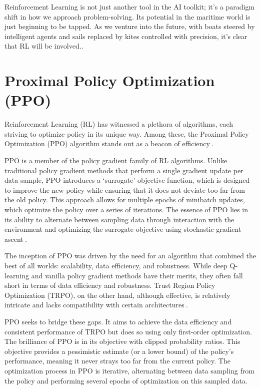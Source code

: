 Reinforcement Learning is not just another tool in the AI toolkit; it's a paradigm shift in how we approach problem-solving. Its potential in the maritime world is just beginning to be tapped. As we venture into the future, with boats steered by intelligent agents and sails replaced by kites controlled with precision, it's clear that RL will be involved.\cite{mnih2015humanlevel}.

\section{Proximal Policy Optimization (PPO)}\label{sec:ppo_background}

Reinforcement Learning (RL) has witnessed a plethora of algorithms, each striving to optimize policy in its unique way. Among these, the Proximal Policy Optimization (PPO) algorithm stands out as a beacon of efficiency$~$\cite{schulman2017ppo}.

PPO is a member of the policy gradient family of RL algorithms. Unlike traditional policy gradient methods that perform a single gradient update per data sample, PPO introduces a `surrogate' objective function, which is designed to improve the new policy while ensuring that it does not deviate too far from the old policy. This approach allows for multiple epochs of minibatch updates, which optimize the policy over a series of iterations. The essence of PPO lies in its ability to alternate between sampling data through interaction with the environment and optimizing the surrogate objective using stochastic gradient ascent$~$\cite{beznosikov2023stochastic}.

The inception of PPO was driven by the need for an algorithm that combined the best of all worlds: scalability, data efficiency, and robustness. While deep Q-learning and vanilla policy gradient methods have their merits, they often fall short in terms of data efficiency and robustness. Trust Region Policy Optimization (TRPO), on the other hand, although effective, is relatively intricate and lacks compatibility with certain architectures$~$\cite{Engstrom2020Implementation}.

PPO seeks to bridge these gaps. It aims to achieve the data efficiency and consistent performance of TRPO but does so using only first-order optimization. The brilliance of PPO is in its objective with clipped probability ratios. This objective provides a pessimistic estimate (or a lower bound) of the policy's performance, meaning it never strays too far from the current policy. The optimization process in PPO is iterative, alternating between data sampling from the policy and performing several epochs of optimization on this sampled data.


